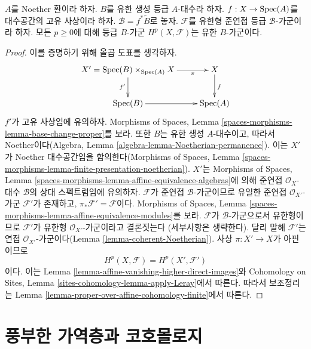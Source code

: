 \begin{lemma}
\label{lemma-graded-finiteness}
$A$를 Noether 환이라 하자. $B$를 유한 생성 등급 $A$-대수라 하자.
$f : X \to \mathop{\mathrm{Spec}}(A)$를 대수공간의 고유 사상이라 하자.
$\mathcal{B} = f^*\widetilde B$로 놓자. $\mathcal{F}$를 유한형
준연접 등급 $\mathcal{B}$-가군이라 하자. 모든 $p \geq 0$에 대해
등급 $B$-가군 $H^p(X, \mathcal{F})$는 유한 $B$-가군이다.
\end{lemma}

\begin{proof}
이를 증명하기 위해 올곱 도표를 생각하자.
$$
\xymatrix{
X' = \Spec(B) \times_{\Spec(A)} X
\ar[r]_-\pi \ar[d]_{f'} &
X \ar[d]^f \\
\Spec(B) \ar[r] &
\Spec(A)
}
$$
$f'$가 고유 사상임에 유의하자. Morphisms of Spaces, Lemma
\ref{spaces-morphisms-lemma-base-change-proper}를 보라. 또한 $B$는
유한 생성 $A$-대수이고, 따라서 Noether이다(Algebra, Lemma
\ref{algebra-lemma-Noetherian-permanence}). 이는 $X'$가 Noether
대수공간임을 함의한다(Morphisms of Spaces, Lemma
\ref{spaces-morphisms-lemma-finite-presentation-noetherian}).
$X'$는 Morphisms of Spaces, Lemma
\ref{spaces-morphisms-lemma-affine-equivalence-algebras}에 의해 준연접
$\mathcal{O}_X$-대수 $\mathcal{B}$의 상대 스펙트럼임에 유의하자.
$\mathcal{F}$가 준연접 $\mathcal{B}$-가군이므로 유일한 준연접
$\mathcal{O}_{X'}$-가군 $\mathcal{F}'$가 존재하고,
$\pi_*\mathcal{F}' = \mathcal{F}$이다. Morphisms of
Spaces, Lemma
\ref{spaces-morphisms-lemma-affine-equivalence-modules}를 보라.
$\mathcal{F}$가 $\mathcal{B}$-가군으로서 유한형이므로
$\mathcal{F}'$가 유한형 $\mathcal{O}_{X'}$-가군이라고 결론짓는다
(세부사항은 생략한다). 달리 말해 $\mathcal{F}'$는 연접
$\mathcal{O}_{X'}$-가군이다(Lemma
\ref{lemma-coherent-Noetherian}). 사상 $\pi : X' \to X$가
아핀이므로
$$
H^p(X, \mathcal{F}) = H^p(X', \mathcal{F}')
$$
이다. 이는 Lemma \ref{lemma-affine-vanishing-higher-direct-images}와
Cohomology on Sites, Lemma
\ref{sites-cohomology-lemma-apply-Leray}에서 따른다. 따라서 보조정리는
Lemma \ref{lemma-proper-over-affine-cohomology-finite}에서 따른다.
\end{proof}









\section{풍부한 가역층과 코호몰로지}
\label{section-ample-cohomology}

